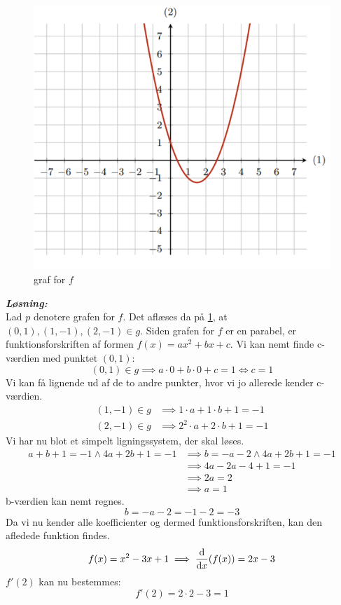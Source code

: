 \documentclass{article}
\newcommand{\sol}{\setlength{\parindent}{0cm}\textbf{\textit{Løsning:}}\setlength{\parindent}{1cm}}
\begin{document}
\begin{figure}[h]
\begin{center}
  \includegraphics[scale=0.5]{mat16.3.png}
\end{center}
\caption{graf for $f$}
\label{fig:3}
\end{figure}
\sol\\ 
Lad $p$ denotere grafen for $f$. 
Det aflæses da på \cref{fig:3}, at $(0,1), (1,-1), (2,-1) \in g$. Siden grafen for $f$ er en parabel, er funktionsforskriften af formen $f(x)=ax^2+bx+c$. Vi kan nemt finde c-værdien med punktet $(0,1)$:
\[
(0,1)\in g \implies a\cdot 0+b\cdot 0+c=1 \iff c=1
\] 
Vi kan få lignende ud af de to andre punkter, hvor vi jo allerede kender c-værdien.
\begin{equation*}
\begin{split}
  (1,-1)\in g &\implies 1\cdot a+1\cdot b+1=-1\\ 
  (2,-1)\in g &\implies 2^2 \cdot a + 2\cdot b+1=-1
\end{split}
\end{equation*}
Vi har nu blot et simpelt ligningssystem, der skal løses.
\begin{equation*}
\begin{split}
  a+b+1=-1 \land 4a+2b+1=-1 &\implies b=-a-2 \land 4a+2b+1=-1\\ 
  &\implies 4a-2a-4+1=-1\\ 
  &\implies 2a=2\\ 
  &\implies a=1
\end{split}
\end{equation*}
b-værdien kan nemt regnes.
\[
b=-a-2=-1-2=-3
\] 
Da vi nu kender alle koefficienter og dermed funktionsforskriften, kan den afledede funktion findes.
\[
f(x)=x^2-3x+1 \implies \dv{x} (f(x))=2x-3
\] 
$f'(2)$ kan nu bestemmes:
\[
f'(2)=2\cdot 2-3=1
\] 
\end{document}

